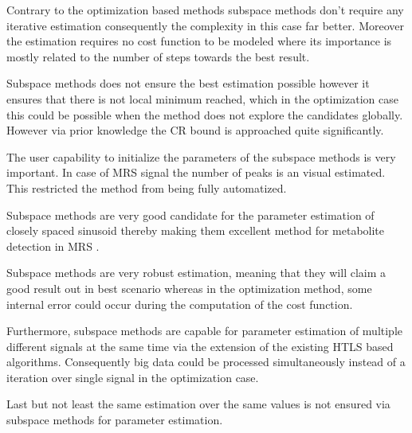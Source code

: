 Contrary to the optimization based methods subspace methods don't require any iterative estimation consequently the complexity in this case far better. Moreover the estimation requires no cost function to be modeled where its importance is mostly related to the number of steps towards the best result.

Subspace methods does not ensure the best estimation possible however it ensures that there is not local minimum reached, which in the optimization case this could be possible when the method does not explore the candidates globally. However via prior knowledge the CR bound is approached quite significantly\cite{7}.

The user capability to initialize the parameters of the subspace methods is very important. In case of MRS signal the number of peaks is an visual estimated. This restricted the method from being fully automatized. 

Subspace methods are very good candidate for the parameter estimation of closely spaced sinusoid thereby making them excellent method for metabolite detection in MRS \cite{9}.  

Subspace methods are very robust estimation, meaning that they will claim a good result out in best scenario whereas in the optimization method, some internal error could occur during the computation of the cost function\cite{9}.

Furthermore, subspace methods are capable for parameter estimation of multiple different signals at the same time via the extension of the existing HTLS based algorithms\cite{10}. Consequently big data could be processed simultaneously instead of a iteration over single signal in the optimization case.

Last but not least the same estimation over the same values is not ensured via subspace methods for parameter estimation. 


